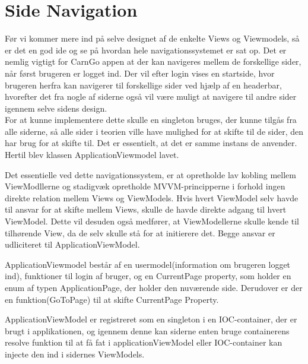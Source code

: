 \documentclass[SoftwareDesign/SoftwareDesign_main.tex]{subfiles}
\begin{document}
\section{Side Navigation}
Før vi kommer mere ind på selve designet af de enkelte Views og Viewmodels, så er det en god ide og se på hvordan hele navigationssystemet er sat op. Det er nemlig vigtigt for CarnGo appen at der kan navigeres mellem de forskellige sider, når først brugeren er logget ind. Der vil efter login vises en startside, hvor brugeren herfra kan navigerer til forskellige sider ved hjælp af en headerbar, hvorefter det fra nogle af siderne også vil være muligt at navigere til andre sider igennem selve sidens design. \\
For at kunne implementere dette skulle en singleton bruges, der kunne tilgås fra alle siderne, så alle sider i teorien ville have mulighed for at skifte til de sider, den har brug for at skifte til. Det er essentielt, at det er samme instans de anvender. Hertil blev klassen ApplicationViewmodel lavet. 

Det essentielle ved dette navigationssystem, er at opretholde lav kobling mellem ViewModllerne og stadigvæk opretholde MVVM-principperne i forhold ingen direkte relation mellem Views og ViewModels. Hvis hvert ViewModel selv havde til ansvar for at skifte mellem Views, skulle de havde direkte adgang til hvert ViewModel. Dette vil desuden også medfører, at ViewModellerne skulle kende til tilhørende View, da de selv skulle stå for at initierere det. Begge ansvar er udliciteret til ApplicationViewModel. 

ApplicationViewmodel består af en usermodel(information om brugeren logget ind), funktioner til login af bruger, og en CurrentPage property, som holder en enum af typen ApplicationPage, der holder den nuværende side. Derudover er der en funktion(GoToPage) til at skifte CurrentPage Property. 

ApplicationViewModel er registreret som en singleton i en IOC-container, der er brugt i applikationen, og igennem denne kan siderne enten bruge containerens resolve funktion til at få fat i applicationViewModel eller IOC-container kan injecte den ind i sidernes ViewModels. 
\end{document}

